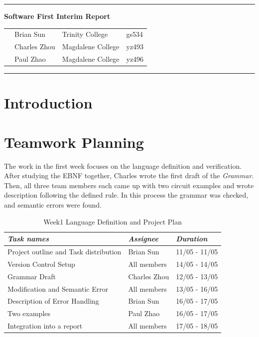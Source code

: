 \documentclass[12pt]{article}
\def\n{\noindent}
\begin{document}
\vspace{0.3cm}
\rule{15.7cm}{0.5mm}


\begin{center}
{\hspace{0.6cm}\Large \textbf {Software First Interim Report}\\
}
\end{center}
\begin{table}[H]
\centering
\begin{tabular}{ p{1.5cm}p{5cm}p{6cm} p{6cm}}
&Brian Sun & Trinity College & gs534 \\
&Charles Zhou & Magdalene College & yz493 \\
&Paul Zhao & Magdalene College & yz496 \\
\end{tabular}
\end{table}


\begin{center}
\rule{15.7cm}{0.5mm}
\end{center}

\section{Introduction}
\section{Teamwork Planning}
\n The work in the first week focuses on the language definition and verification. After studying the EBNF together, Charles wrote the first draft of the \textit{Grammar}. Then, all three team members each came up with two circuit examples and wrote description following the defined rule. In this process the grammar was checked, and semantic errors were found. \\
\begin{table}[H]
\begin{tabular}{p{8cm}p{4cm}p{3cm}}
\textit{Task names} & \textit{Assignee}&\textit{Duration}\\
\hline
Project outline and Task distribution & Brian Sun & 11/05 - 11/05\\
Version Control Setup & All members & 14/05 - 14/05\\
Grammar Draft 	& Charles Zhou & 12/05 - 13/05\\
Modification and Semantic Error & All members & 13/05 - 16/05\\
Description of Error Handling & Brian Sun & 16/05 - 17/05\\
Two examples & Paul Zhao & 16/05 - 17/05\\
Integration into a report & All members & 17/05 - 18/05\\
\end{tabular}
\caption{Week1 Language Definition and Project Plan}
\end{table}
\end{document}
